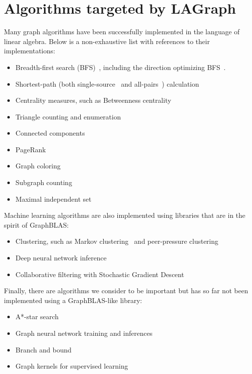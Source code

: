 \section{Algorithms targeted by LAGraph}
\label{sec:algorithms}

Many graph algorithms have been successfully implemented in the language of linear algebra. Below is a non-exhaustive list with references to their implementations:

\begin{itemize}
\item Breadth-first search (BFS)~\cite{bulucc2011parallel, gbtl-cuda16, Davis19}, including the direction optimizing BFS~\cite{Yang:2018:IPE}.
\item Shortest-path (both single-source~\cite{Yang:2019:GBL} and all-pairs~\cite{}) calculation
\item Centrality measures, such as Betweenness centrality~\cite{combblas}
\item Triangle counting and enumeration~\cite{}
\item Connected components~\cite{lacc2019}
\item PageRank
\item Graph coloring~\cite{}
\item Subgraph counting~\cite{chen2019graphblas}
\item Maximal independent set~\cite{jpdc15, Yang:2019:GBL}
\end{itemize}

Machine learning algorithms are also implemented using libraries that are in the spirit of GraphBLAS:
\begin{itemize}
\item Clustering, such as Markov clustering~\cite{azad2018hipmcl} and peer-pressure clustering~\cite{}
\item Deep neural network inference~\cite{}
\item Collaborative filtering with Stochastic Gradient Descent~\cite{}
\end{itemize}

Finally, there are algorithms we consider to be important but has so far not been implemented using a GraphBLAS-like library:
\begin{itemize}
\item A*-star search
\item Graph neural network training and inferences
\item Branch and bound
\item Graph kernels for supervised learning
\end{itemize}
